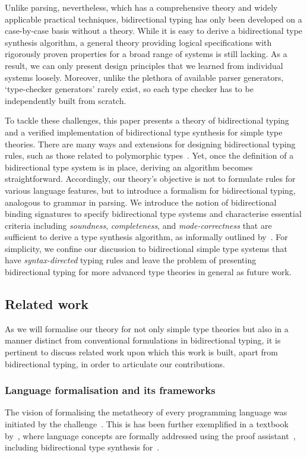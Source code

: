 Unlike parsing, nevertheless, which has a comprehensive theory and widely applicable practical techniques, bidirectional typing has only been developed on a case-by-case basis without a theory.
While it is easy to derive a bidirectional type synthesis algorithm, a general theory providing logical specifications with rigorously proven properties for a broad range of systems is still lacking.
As a result, we can only present design principles that we learned from individual systems loosely.
Moreover, unlike the plethora of available parser generators, `type-checker generators' rarely exist, so each type checker has to be independently built from scratch.

To tackle these challenges, this paper presents a theory of bidirectional typing and a verified implementation of bidirectional type synthesis for simple type theories.
There are many ways and extensions for designing bidirectional typing rules, such as those related to polymorphic types~\citep{Pierce2000,Peyton-Jones2007,Dunfield2013,Xie2018}.
Yet, once the definition of a bidirectional type system is in place, deriving an algorithm becomes straightforward.
Accordingly, our theory's objective is not to formulate rules for various language features, but to introduce a formalism for bidirectional typing, analogous to grammar in parsing.
We introduce the notion of bidirectional binding signatures to specify bidirectional type systems and characterise essential criteria including \emph{soundness}, \emph{completeness}, and \emph{mode-correctness} that are sufficient to derive a type synthesis algorithm, as informally outlined by~\citet{Dunfield2021}.
For simplicity, we confine our discussion to bidirectional simple type systems that have \emph{syntax-directed} typing rules and leave the problem of presenting bidirectional typing for more advanced type theories in general as future work.

\subsection{Related work}\label{sec:related-work}
As we will formalise our theory for not only simple type theories but also in a manner distinct from conventional formulations in bidirectional typing, it is pertinent to discuss related work upon which this work is built, apart from bidirectional typing, in order to articulate our contributions.

\subsubsection{Language formalisation and its frameworks} \label{sec:language-formalisation}
The vision of formalising the metatheory of every programming language was initiated by the \PoplMark challenge~\citep{Aydemir2005}.
This is has been further exemplified in a textbook by~\citet{Wadler2022}, where language concepts are formally addressed using the proof assistant~\Agda, including bidirectional type synthesis for~\PCF.

